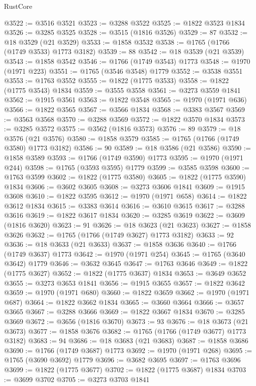 \begin{lexlean}{RustCore}
\begin{coremodule}
@3522 := @3516 @3521
@3523 := @3288 @3522
@3525 := @1822 @3523 @1834
@3526 := @3285 @3525
@3528 := @3515 (@1816 @3526)
@3529 := 87
@3532 := @18 @3529 (@21 @3529)
@3533 := @1858 @3532
@3538 := @1765 (@1766 (@1749 @3533) @1773 @3182)
@3539 := 88
@3542 := @18 @3539 (@21 @3539)
@3543 := @1858 @3542
@3546 := @1766 (@1749 @3543) @1773
@3548 := @1970 (@1971 @223)
@3551 := @1765 (@3546 @3548) @1779
@3552 := @3538 @3551
@3553 := @1763 @3552
@3555 := @1822 (@1775 @3533)
@3558 := @1822 (@1775 @3543) @1834
@3559 := @3555 @3558
@3561 := @3273 @3559 @1841
@3562 := @1915 @3561
@3563 := @1822 @3548
@3565 := @1970 (@1971 @636)
@3566 := @1822 @3565
@3567 := @3566 @1834
@3568 := @3383 @3567
@3569 := @3563 @3568
@3570 := @3288 @3569
@3572 := @1822 @3570 @1834
@3573 := @3285 @3572
@3575 := @3562 (@1816 @3573)
@3576 := 89
@3579 := @18 @3576 (@21 @3576)
@3580 := @1858 @3579
@3585 := @1765 (@1766 (@1749 @3580) @1773 @3182)
@3586 := 90
@3589 := @18 @3586 (@21 @3586)
@3590 := @1858 @3589
@3593 := @1766 (@1749 @3590) @1773
@3595 := @1970 (@1971 @244)
@3598 := @1765 (@3593 @3595) @1779
@3599 := @3585 @3598
@3600 := @1763 @3599
@3602 := @1822 (@1775 @3580)
@3605 := @1822 (@1775 @3590) @1834
@3606 := @3602 @3605
@3608 := @3273 @3606 @1841
@3609 := @1915 @3608
@3610 := @1822 @3595
@3612 := @1970 (@1971 @658)
@3614 := @1822 @3612 @1834
@3615 := @3383 @3614
@3616 := @3610 @3615
@3617 := @3288 @3616
@3619 := @1822 @3617 @1834
@3620 := @3285 @3619
@3622 := @3609 (@1816 @3620)
@3623 := 91
@3626 := @18 @3623 (@21 @3623)
@3627 := @1858 @3626
@3632 := @1765 (@1766 (@1749 @3627) @1773 @3182)
@3633 := 92
@3636 := @18 @3633 (@21 @3633)
@3637 := @1858 @3636
@3640 := @1766 (@1749 @3637) @1773
@3642 := @1970 (@1971 @254)
@3645 := @1765 (@3640 @3642) @1779
@3646 := @3632 @3645
@3647 := @1763 @3646
@3649 := @1822 (@1775 @3627)
@3652 := @1822 (@1775 @3637) @1834
@3653 := @3649 @3652
@3655 := @3273 @3653 @1841
@3656 := @1915 @3655
@3657 := @1822 @3642
@3659 := @1970 (@1971 @680)
@3660 := @1822 @3659
@3662 := @1970 (@1971 @687)
@3664 := @1822 @3662 @1834
@3665 := @3660 @3664
@3666 := @3657 @3665
@3667 := @3288 @3666
@3669 := @1822 @3667 @1834
@3670 := @3285 @3669
@3672 := @3656 (@1816 @3670)
@3673 := 93
@3676 := @18 @3673 (@21 @3673)
@3677 := @1858 @3676
@3682 := @1765 (@1766 (@1749 @3677) @1773 @3182)
@3683 := 94
@3686 := @18 @3683 (@21 @3683)
@3687 := @1858 @3686
@3690 := @1766 (@1749 @3687) @1773
@3692 := @1970 (@1971 @268)
@3695 := @1765 (@3690 @3692) @1779
@3696 := @3682 @3695
@3697 := @1763 @3696
@3699 := @1822 (@1775 @3677)
@3702 := @1822 (@1775 @3687) @1834
@3703 := @3699 @3702
@3705 := @3273 @3703 @1841

\end{coremodule}
\end{lexlean}
